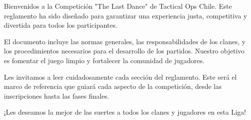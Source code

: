 
Bienvenidos a la Competición "The Last Dance" de Tactical Ops Chile. Este reglamento ha sido diseñado para garantizar una experiencia justa, competitiva y divertida para todos los participantes.

El documento incluye las normas generales, las responsabilidades de los clanes, y los procedimientos necesarios para el desarrollo de los partidos. Nuestro objetivo es fomentar el juego limpio y fortalecer la comunidad de jugadores.

Les invitamos a leer cuidadosamente cada sección del reglamento. Este será el marco de referencia que guiará cada aspecto de la competición, desde las inscripciones hasta las fases finales.

¡Les deseamos la mejor de las suertes a todos los clanes y jugadores en esta Liga!